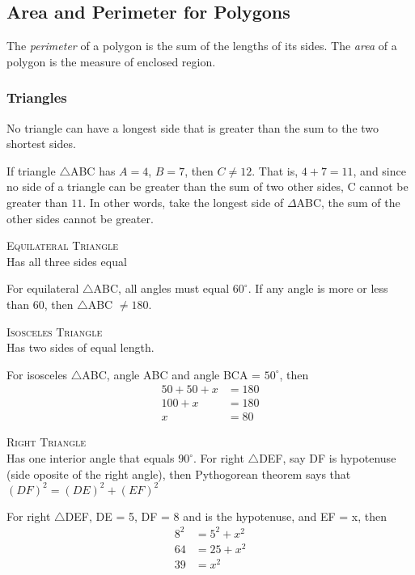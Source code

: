    \subsection{Area and Perimeter for Polygons}
The \textsl{perimeter} of a polygon is the sum of the lengths of its sides. The \textsl{area} of a polygon is the measure of enclosed region.

   \subsubsection{Triangles}
\begin{maxim}
No triangle can have a longest side that is greater than the sum to the two shortest sides.
\end{maxim}
\begin{example}
    If triangle $\bigtriangleup$ABC has $A = 4$, $B = 7$, then $C \neq 12$. That is, $4 + 7 =11$, and since no side of a triangle can be greater than the sum of two other sides, C cannot be greater than $11$. In other words, take the longest side of $\Delta$ABC, the sum of the other sides cannot be greater.
\end{example}
\begin{definition}\textsc{Equilateral Triangle}\\
Has all three sides equal
\end{definition}
\begin{example}
    For equilateral $\bigtriangleup$ABC, all angles must equal $60^\circ$. If any angle is more or less than 60, then $\bigtriangleup$ABC $\neq 180$.
\end{example}

\begin{definition}\textsc{Isosceles Triangle}\\
Has two sides of equal length. 
\end{definition}
\begin{example}
    For isosceles $\bigtriangleup$ABC, angle ABC and angle BCA = $50^\circ$, then
\begin{align*}
    50 + 50 + x &= 180\\
   100 + x &= 180\\
   x &= 80
\end{align*}
\end{example}

\begin{definition}\textsc{Right Triangle}\\
Has one interior angle that equals $90^\circ$. For right $\bigtriangleup$DEF, say DF is hypotenuse (side oposite of the right angle), then Pythogorean theorem says that $(DF)^2 = (DE)^2 + (EF)^2$
\end{definition}
\begin{example}
    For right $\bigtriangleup$DEF, DE = 5, DF = 8 and is the hypotenuse, and EF = x, then
\begin{align*}
    8^2 &= 5^2 + x^2\\
   64 &= 25 + x^2\\
   39 &= x^2
\end{align*}
\end{example}

% 
